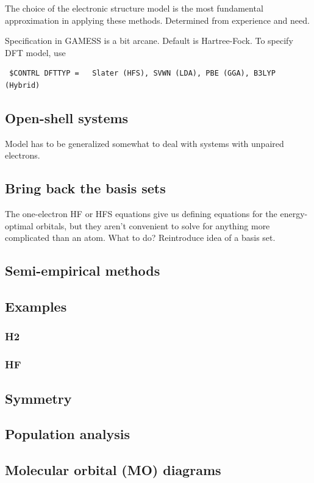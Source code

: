 \documentclass[11pt]{article}
\begin{document}
The choice of the electronic structure model is the most fundamental approximation in
applying these methods.  Determined from experience and need.

Specification in GAMESS is a bit arcane.  Default is Hartree-Fock. To specify DFT model, use
\begin{verbatim}
 $CONTRL DFTTYP =   Slater (HFS), SVWN (LDA), PBE (GGA), B3LYP (Hybrid)
\end{verbatim}

\subsection{Open-shell systems}
\label{sec-5-3}
Model has to be generalized somewhat to deal with systems with unpaired electrons.

\subsection{Bring back the basis sets}
\label{sec-5-4}
The one-electron HF or HFS equations give us defining equations for
the energy-optimal orbitals, but they aren't convenient to solve for
anything more complicated than an atom. What to do? Reintroduce idea
of a basis set.

\subsection{Semi-empirical methods}
\label{sec-5-5}
\subsection{Examples}
\label{sec-5-6}
\subsubsection{H2}
\label{sec-5-6-1}
\subsubsection{HF}
\label{sec-5-6-2}
\subsection{Symmetry}
\label{sec-5-7}
\subsection{Population analysis}
\label{sec-5-8}
\subsection{Molecular orbital (MO) diagrams}
\label{sec-5-9}
\end{document}
